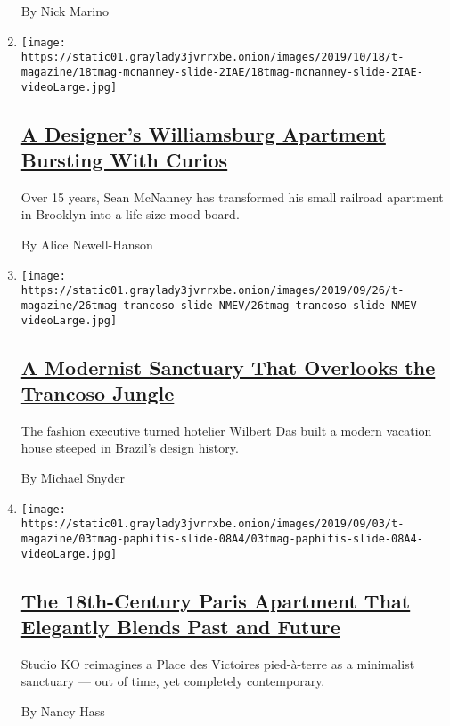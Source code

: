 \begin{enumerate}
  By Nick Marino
\item
  \texttt{[image: https://static01.graylady3jvrrxbe.onion/images/2019/10/18/t-magazine/18tmag-mcnanney-slide-2IAE/18tmag-mcnanney-slide-2IAE-videoLarge.jpg]}

  \hypertarget{a-designers-williamsburg-apartment-bursting-with-curios}{%
  \subsection{\texorpdfstring{\href{/2019/10/18/t-magazine/sean-mcnanney.html}{A
  Designer's Williamsburg Apartment Bursting With
  Curios}}{A Designer's Williamsburg Apartment Bursting With Curios}}\label{a-designers-williamsburg-apartment-bursting-with-curios}}

  Over 15 years, Sean McNanney has transformed his small railroad
  apartment in Brooklyn into a life-size mood board.

  By Alice Newell-Hanson
\item
  \texttt{[image: https://static01.graylady3jvrrxbe.onion/images/2019/09/26/t-magazine/26tmag-trancoso-slide-NMEV/26tmag-trancoso-slide-NMEV-videoLarge.jpg]}

  \hypertarget{a-modernist-sanctuary-that-overlooks-the-trancoso-jungle}{%
  \subsection{\texorpdfstring{\href{/2019/09/26/t-magazine/trancoso-brazil-house.html}{A
  Modernist Sanctuary That Overlooks the Trancoso
  Jungle}}{A Modernist Sanctuary That Overlooks the Trancoso Jungle}}\label{a-modernist-sanctuary-that-overlooks-the-trancoso-jungle}}

  The fashion executive turned hotelier Wilbert Das built a modern
  vacation house steeped in Brazil's design history.

  By Michael Snyder
\item
  \texttt{[image: https://static01.graylady3jvrrxbe.onion/images/2019/09/03/t-magazine/03tmag-paphitis-slide-08A4/03tmag-paphitis-slide-08A4-videoLarge.jpg]}

  \hypertarget{the-18th-century-paris-apartment-that-elegantly-blends-past-and-future}{%
  \subsection{\texorpdfstring{\href{/2019/09/03/t-magazine/place-des-victoires-paris-apartment.html}{The
  18th-Century Paris Apartment That Elegantly Blends Past and
  Future}}{The 18th-Century Paris Apartment That Elegantly Blends Past and Future}}\label{the-18th-century-paris-apartment-that-elegantly-blends-past-and-future}}

  Studio KO reimagines a Place des Victoires pied-à-terre as a
  minimalist sanctuary --- out of time, yet completely contemporary.

  By Nancy Hass
\end{enumerate}

